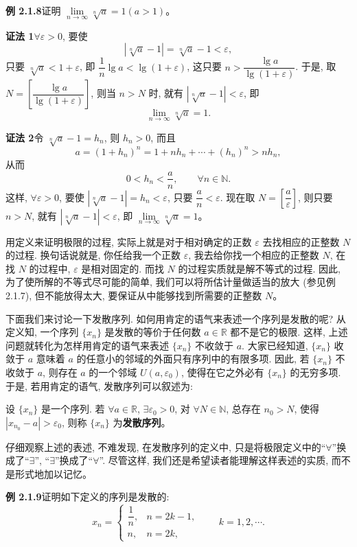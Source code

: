 \documentclass[UTF8,12pt,a4paper,fontset=fandol]{ctexart}
\begin{document}
\noindent\textbf{例 2.1.8}\quad 证明 $\lim\limits_{n\to\infty}\sqrt[n]{a}=1(a>1)$。

\noindent\textbf{证法 1}\quad $\forall\varepsilon>0$, 要使
\[
  |\sqrt[n]{a}-1|=\sqrt[n]{a}-1<\varepsilon,
\]
只要 $\sqrt[n]{a}<1+\varepsilon$, 即 $\dfrac1n\lg a<\lg(1+\varepsilon)$, 这只要 $n>\dfrac{\lg a}{\lg(1+\varepsilon)}$. 于是, 取 $N=\left[\dfrac{\lg a}{\lg(1+\varepsilon)}\right]$, 则当 $n>N$ 时, 就有 $|\sqrt[n]{a}-1|<\varepsilon$, 即
\[
  \lim_{n\to\infty}\sqrt[n]{a}=1.
\]

\noindent\textbf{证法 2}\quad 令 $\sqrt[n]{a}-1=h_n$, 则 $h_n>0$, 而且
\[
  a=(1+h_n)^n=1+nh_n+\cdots+(h_n)^n>nh_n,
\]
从而
\[
  0<h_n<\frac an,\qquad \forall n\in\mathbb{N}.
\]
这样, $\forall\varepsilon>0$, 要使 $|\sqrt[n]{a}-1|=h_n<\varepsilon$, 只要 $\dfrac an<\varepsilon$. 现在取 $N=\left[\dfrac a\varepsilon\right]$, 则只要 $n>N$, 就有 $|\sqrt[n]{a}-1|<\varepsilon$, 即 $\lim\limits_{n\to\infty}\sqrt[n]{a}=1$。

用定义来证明极限的过程, 实际上就是对于相对确定的正数 $\varepsilon$ 去找相应的正整数 $N$ 的过程. 换句话说就是, 你任给我一个正数 $\varepsilon$, 我去给你找一个相应的正整数 $N$, 在找 $N$ 的过程中, $\varepsilon$ 是相对固定的. 而找 $N$ 的过程实质就是解不等式的过程. 因此, 为了使所解的不等式尽可能的简单, 我们可以将所估计量做适当的放大 (参见例 2.1.7), 但不能放得太大, 要保证从中能够找到所需要的正整数 $N$。

下面我们来讨论一下发散序列. 如何用肯定的语气来表述一个序列是发散的呢? 从定义知, 一个序列 $\{x_n\}$ 是发散的等价于任何数 $a\in\mathbb{R}$ 都不是它的极限. 这样, 上述问题就转化为怎样用肯定的语气来表述 $\{x_n\}$ 不收敛于 $a$. 大家已经知道, $\{x_n\}$ 收敛于 $a$ 意味着 $a$ 的任意小的邻域的外面只有序列中的有限多项. 因此, 若 $\{x_n\}$ 不收敛于 $a$, 则存在 $a$ 的一个邻域 $U(a,\varepsilon_0)$, 使得在它之外必有 $\{x_n\}$ 的无穷多项. 于是, 若用肯定的语气, 发散序列可以叙述为:

设 $\{x_n\}$ 是一个序列. 若 $\forall a\in\mathbb{R}$, $\exists\varepsilon_0>0$, 对 $\forall N\in\mathbb{N}$, 总存在 $n_0>N$, 使得 $|x_{n_0}-a|>\varepsilon_0$, 则称 $\{x_n\}$ 为\textbf{发散序列}。

仔细观察上述的表述, 不难发现, 在发散序列的定义中, 只是将极限定义中的``$\forall$''换成了``$\exists$'', ``$\exists$''换成了``$\forall$''. 尽管这样, 我们还是希望读者能理解这样表述的实质, 而不是形式地加以记忆。

\noindent\textbf{例 2.1.9}\quad 证明如下定义的序列是发散的:
\[
  x_n=
  \begin{cases}
    \dfrac1n, & n=2k-1,\\
    n, & n=2k,
  \end{cases}
  \qquad k=1,2,\cdots .
\]
\end{document}
